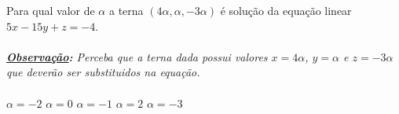Para qual valor de $\alpha$ a terna $(4\alpha,\alpha,-3\alpha)$ é solução da equação linear $5x-15y+z=-4$.\\\vspace{-3mm}\\
{\it {\bf\underline{Observação}:} Perceba que a terna dada possui valores $x=4\alpha$, $y=\alpha$ e $z=-3\alpha$ que deverão ser substituidos na equação.}\\\vspace{-1cm}\\

$\alpha=-2$
$\alpha=0$
$\alpha=-1$
$\alpha=2$
$\alpha=-3$



